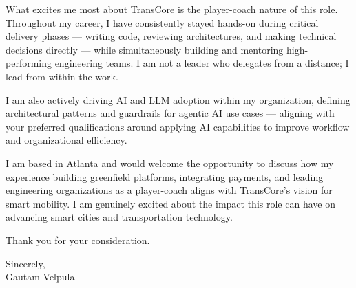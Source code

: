 \documentclass[11pt]{article}
\begin{document}
What excites me most about TransCore is the player-coach nature of this role. Throughout my career, I have consistently stayed hands-on during critical delivery phases --- writing code, reviewing architectures, and making technical decisions directly --- while simultaneously building and mentoring high-performing engineering teams. I am not a leader who delegates from a distance; I lead from within the work.

I am also actively driving AI and LLM adoption within my organization, defining architectural patterns and guardrails for agentic AI use cases --- aligning with your preferred qualifications around applying AI capabilities to improve workflow and organizational efficiency.

I am based in Atlanta and would welcome the opportunity to discuss how my experience building greenfield platforms, integrating payments, and leading engineering organizations as a player-coach aligns with TransCore's vision for smart mobility. I am genuinely excited about the impact this role can have on advancing smart cities and transportation technology.

Thank you for your consideration.

\vspace{12pt}

Sincerely,\\
Gautam Velpula
\end{document}

